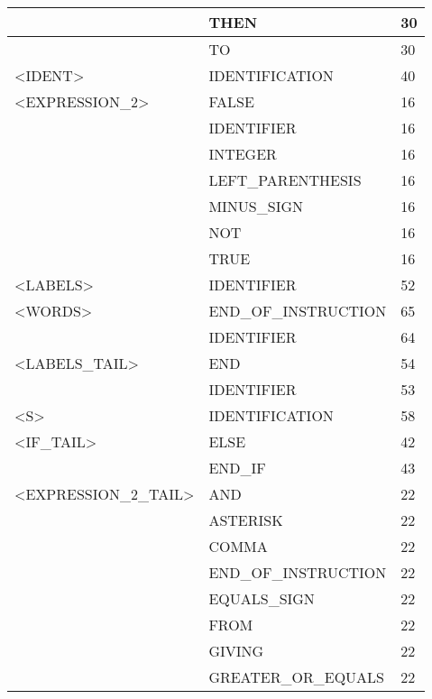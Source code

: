 \begin{longtable}{|l|l|l|}
                     &   THEN                 &   30 \\ \hline
                     &   TO                   &   30 \\ \hline
<IDENT>              &   IDENTIFICATION       &   40 \\ \hline
<EXPRESSION\_2>       &   FALSE                &   16 \\ \hline
                     &   IDENTIFIER           &   16 \\ \hline
                     &   INTEGER              &   16 \\ \hline
                     &   LEFT\_PARENTHESIS     &   16 \\ \hline
                     &   MINUS\_SIGN           &   16 \\ \hline
                     &   NOT                  &   16 \\ \hline
                     &   TRUE                 &   16 \\ \hline
<LABELS>             &   IDENTIFIER           &   52 \\ \hline
<WORDS>              &   END\_OF\_INSTRUCTION   &   65 \\ \hline
                     &   IDENTIFIER           &   64 \\ \hline
<LABELS\_TAIL>        &   END                  &   54 \\ \hline
                     &   IDENTIFIER           &   53 \\ \hline
<S>                  &   IDENTIFICATION       &   58 \\ \hline
<IF\_TAIL>            &   ELSE                 &   42 \\ \hline
                     &   END\_IF               &   43 \\ \hline
<EXPRESSION\_2\_TAIL>  &   AND                  &   22 \\ \hline
                     &   ASTERISK             &   22 \\ \hline
                     &   COMMA                &   22 \\ \hline
                     &   END\_OF\_INSTRUCTION   &   22 \\ \hline
                     &   EQUALS\_SIGN          &   22 \\ \hline
                     &   FROM                 &   22 \\ \hline
                     &   GIVING               &   22 \\ \hline
                     &   GREATER\_OR\_EQUALS    &   22 \\ \hline

\end{longtable}
